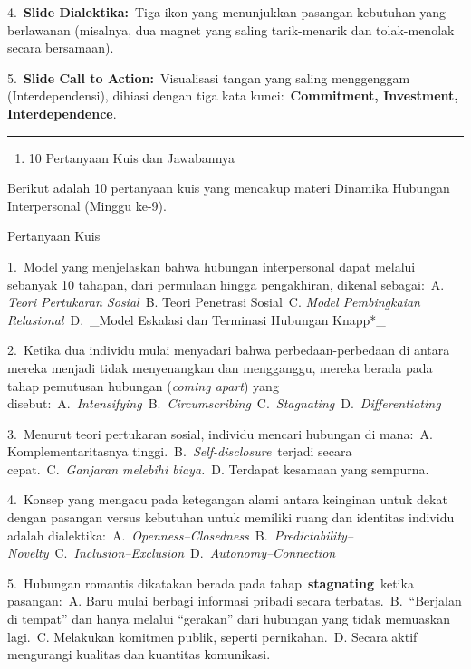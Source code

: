 \documentclass[
  letterpaper,
  DIV=11,
  numbers=noendperiod]{scrreprt}
\providecommand{\tightlist}{%
  \setlength{\itemsep}{0pt}\setlength{\parskip}{0pt}}
\begin{document}
4.~\textbf{Slide Dialektika:}~Tiga ikon yang menunjukkan pasangan
kebutuhan yang berlawanan (misalnya, dua magnet yang saling
tarik-menarik dan tolak-menolak secara bersamaan).

5.~\textbf{Slide Call to Action:}~Visualisasi tangan yang saling
menggenggam (Interdependensi), dihiasi dengan tiga kata
kunci:~\textbf{Commitment, Investment, Interdependence}.

\begin{center}\rule{0.5\linewidth}{0.5pt}\end{center}

\begin{enumerate}
\def\labelenumi{\arabic{enumi}.}
\setcounter{enumi}{3}
\tightlist
\item
  10 Pertanyaan Kuis dan Jawabannya
\end{enumerate}

Berikut adalah 10 pertanyaan kuis yang mencakup materi Dinamika Hubungan
Interpersonal (Minggu ke-9).

Pertanyaan Kuis

1.~Model yang menjelaskan bahwa hubungan interpersonal dapat melalui
sebanyak 10 tahapan, dari permulaan hingga pengakhiran, dikenal
sebagai:~A. \emph{Teori Pertukaran Sosial}~B. Teori Penetrasi Sosial~C.
\emph{Model Pembingkaian Relasional}~D.~\_Model Eskalasi dan Terminasi
Hubungan Knapp*\_

2.~Ketika dua individu mulai menyadari bahwa perbedaan-perbedaan di
antara mereka menjadi tidak menyenangkan dan mengganggu, mereka berada
pada tahap pemutusan hubungan (\emph{coming apart}) yang
disebut:~A.~\emph{Intensifying}~B.~\emph{Circumscribing}~C.~\emph{Stagnating}~D.~\emph{Differentiating}

3.~Menurut teori pertukaran sosial, individu mencari hubungan di
mana:~A. Komplementaritasnya tinggi.~B.~\emph{Self-disclosure}~terjadi
secara cepat.~C.~\emph{Ganjaran melebihi biaya.}~D. Terdapat kesamaan
yang sempurna.

4.~Konsep yang mengacu pada ketegangan alami antara keinginan untuk
dekat dengan pasangan versus kebutuhan untuk memiliki ruang dan
identitas individu adalah
dialektika:~A.~\emph{Openness--Closedness}~B.~\emph{Predictability--Novelty}~C.~\emph{Inclusion--Exclusion}~D.~\emph{Autonomy--Connection}

5.~Hubungan romantis dikatakan berada pada
tahap~\textbf{stagnating}~ketika pasangan:~A. Baru mulai berbagi
informasi pribadi secara terbatas.~B.~``Berjalan di tempat'' dan hanya
melalui ``gerakan'' dari hubungan yang tidak memuaskan lagi.~C.
Melakukan komitmen publik, seperti pernikahan.~D. Secara aktif
mengurangi kualitas dan kuantitas komunikasi.
\end{document}

